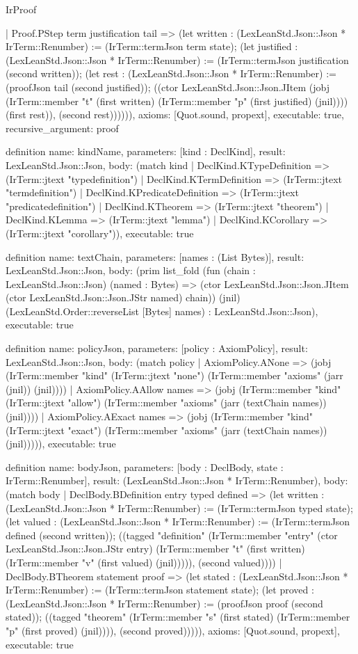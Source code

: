 \begin{lexlean}{IrProof}
\begin{semanticmodule}
{    | Proof.PStep term justification tail => (let written : (LexLeanStd.Json::Json * IrTerm::Renumber) := (IrTerm::termJson term state); (let justified : (LexLeanStd.Json::Json * IrTerm::Renumber) := (IrTerm::termJson justification (second written)); (let rest : (LexLeanStd.Json::Json * IrTerm::Renumber) := (proofJson tail (second justified)); ((ctor LexLeanStd.Json::Json.JItem (jobj (IrTerm::member "t" (first written) (IrTerm::member "p" (first justified) (jnil)))) (first rest)), (second rest)))))),
  axioms: [Quot.sound, propext],
  executable: true,
  recursive_argument: proof
}

definition{
  name: kindName,
  parameters: [kind : DeclKind],
  result: LexLeanStd.Json::Json,
  body: (match kind
    | DeclKind.KTypeDefinition => (IrTerm::jtext "typedefinition")
    | DeclKind.KTermDefinition => (IrTerm::jtext "termdefinition")
    | DeclKind.KPredicateDefinition => (IrTerm::jtext "predicatedefinition")
    | DeclKind.KTheorem => (IrTerm::jtext "theorem")
    | DeclKind.KLemma => (IrTerm::jtext "lemma")
    | DeclKind.KCorollary => (IrTerm::jtext "corollary")),
  executable: true
}

definition{
  name: textChain,
  parameters: [names : (List Bytes)],
  result: LexLeanStd.Json::Json,
  body: (prim list_fold (fun (chain : LexLeanStd.Json::Json) (named : Bytes) => (ctor LexLeanStd.Json::Json.JItem (ctor LexLeanStd.Json::Json.JStr named) chain)) (jnil) (LexLeanStd.Order::reverseList [Bytes] names) : LexLeanStd.Json::Json),
  executable: true
}

definition{
  name: policyJson,
  parameters: [policy : AxiomPolicy],
  result: LexLeanStd.Json::Json,
  body: (match policy
    | AxiomPolicy.ANone => (jobj (IrTerm::member "kind" (IrTerm::jtext "none") (IrTerm::member "axioms" (jarr (jnil)) (jnil))))
    | AxiomPolicy.AAllow names => (jobj (IrTerm::member "kind" (IrTerm::jtext "allow") (IrTerm::member "axioms" (jarr (textChain names)) (jnil))))
    | AxiomPolicy.AExact names => (jobj (IrTerm::member "kind" (IrTerm::jtext "exact") (IrTerm::member "axioms" (jarr (textChain names)) (jnil))))),
  executable: true
}

definition{
  name: bodyJson,
  parameters: [body : DeclBody, state : IrTerm::Renumber],
  result: (LexLeanStd.Json::Json * IrTerm::Renumber),
  body: (match body
    | DeclBody.BDefinition entry typed defined => (let written : (LexLeanStd.Json::Json * IrTerm::Renumber) := (IrTerm::termJson typed state); (let valued : (LexLeanStd.Json::Json * IrTerm::Renumber) := (IrTerm::termJson defined (second written)); ((tagged "definition" (IrTerm::member "entry" (ctor LexLeanStd.Json::Json.JStr entry) (IrTerm::member "t" (first written) (IrTerm::member "v" (first valued) (jnil))))), (second valued))))
    | DeclBody.BTheorem statement proof => (let stated : (LexLeanStd.Json::Json * IrTerm::Renumber) := (IrTerm::termJson statement state); (let proved : (LexLeanStd.Json::Json * IrTerm::Renumber) := (proofJson proof (second stated)); ((tagged "theorem" (IrTerm::member "s" (first stated) (IrTerm::member "p" (first proved) (jnil)))), (second proved))))),
  axioms: [Quot.sound, propext],
  executable: true
}


\end{semanticmodule}
\end{lexlean}
